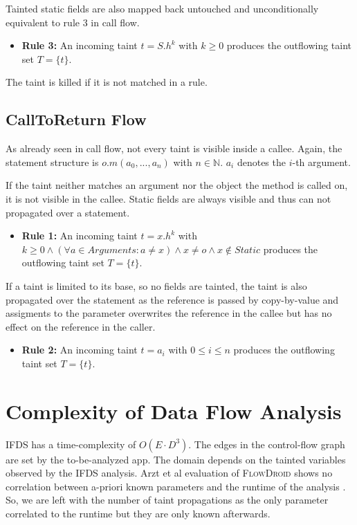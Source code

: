 \documentclass[../draft.tex]{subfiles}
\begin{document}
    Tainted static fields are also mapped back untouched and unconditionally equivalent to rule 3 in call flow.
    \begin{itemize}
        \item[] \textbf{Rule 3:} An incoming taint $t = S.h^k$ with $k \geq 0$ produces the outflowing taint set $T = \{t\}$. 
    \end{itemize}

    The taint is killed if it is not matched in a rule.
    \subsection{CallToReturn Flow}
    As already seen in call flow, not every taint is visible inside a callee. 
    Again, the statement structure is $o.m(a_0, ..., a_n)$ with $n \in \mathbb{N}$. $a_i$ denotes the $i$-th argument.

    If the taint neither matches an argument nor the object the method is called on, it is not visible in the callee. Static fields are always visible and thus can not propagated over a statement.
    \begin{itemize}
        \item[] \textbf{Rule 1:} An incoming taint $t = x.h^k$ with $k \geq 0 \land (\forall a \in \mathit{Arguments}: a \neq x) \land x \neq o \land x \notin \mathit{Static}$ produces the outflowing taint set $T = \{t\}$. 
    \end{itemize}

    If a taint is limited to its base, so no fields are tainted, the taint is also propagated over the statement as the reference is passed by copy-by-value and assigments to the parameter overwrites the reference in the callee but has no effect on the reference in the caller.
    \begin{itemize}
        \item[] \textbf{Rule 2:} An incoming taint $t = a_i$ with $0 \leq i \leq n$ produces the outflowing taint set $T = \{t\}$. 
    \end{itemize}
        

    \section{Complexity of Data Flow Analysis}
    IFDS has a time-complexity of $O(E \cdot D^3)$. The edges in the control-flow graph are set by the to-be-analyzed app. The domain depends on the tainted variables observed by the IFDS analysis. Arzt et al evaluation of \textsc{FlowDroid} shows no correlation between a-priori known parameters and the runtime of the analysis \cite{Arzt2017PhD}. So, we are left with the number of taint propagations as the only parameter correlated to the runtime but they are only known afterwards. 
\end{document}
